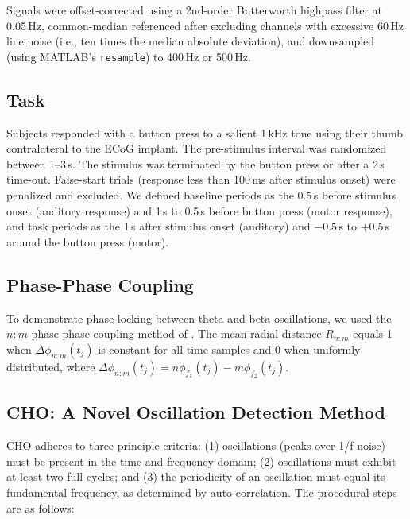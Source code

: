 \documentclass[11pt]{article}
\begin{document}
Signals were offset-corrected using a 2nd-order Butterworth highpass filter at 0.05\,Hz, common-median referenced \citep{liu2015} after excluding channels with excessive 60\,Hz line noise (i.e., ten times the median absolute deviation), and downsampled (using MATLAB's \texttt{resample}) to 400\,Hz or 500\,Hz.

\subsection{Task}
Subjects responded with a button press to a salient 1\,kHz tone using their thumb contralateral to the ECoG implant. The pre-stimulus interval was randomized between 1--3\,s. The stimulus was terminated by the button press or after a 2\,s time-out. False-start trials (response less than 100\,ms after stimulus onset) were penalized and excluded. We defined baseline periods as the 0.5\,s before stimulus onset (auditory response) and 1\,s to 0.5\,s before button press (motor response), and task periods as the 1\,s after stimulus onset (auditory) and $-0.5$\,s to $+0.5$\,s around the button press (motor).

\subsection{Phase-Phase Coupling}
To demonstrate phase-locking between theta and beta oscillations, we used the $n{:}m$ phase-phase coupling method of \citet{belluscio2012}. The mean radial distance $R_{n{:}m}$ equals 1 when $\Delta\phi_{n{:}m}(t_j)$ is constant for all time samples and 0 when uniformly distributed, where $\Delta\phi_{n{:}m}(t_j) = n\phi_{f_1}(t_j) - m\phi_{f_2}(t_j)$.

\subsection{CHO: A Novel Oscillation Detection Method}
CHO adheres to three principle criteria: (1) oscillations (peaks over 1/f noise) must be present in the time and frequency domain; (2) oscillations must exhibit at least two full cycles; and (3) the periodicity of an oscillation must equal its fundamental frequency, as determined by auto-correlation. The procedural steps are as follows:
\end{document}
